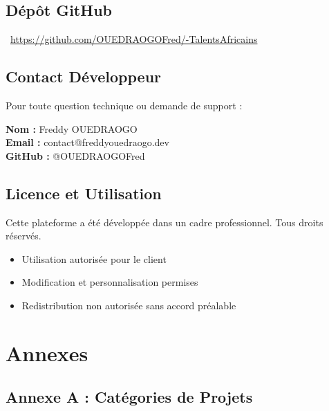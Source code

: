 \documentclass[12pt,a4paper]{article}
\begin{document}
\subsection{Dépôt GitHub}

\begin{tcolorbox}[colback=primarycolor!10, colframe=primarycolor]
\centering
\faGithub\ \url{https://github.com/OUEDRAOGOFred/-TalentsAfricains}
\end{tcolorbox}

\subsection{Contact Développeur}

Pour toute question technique ou demande de support :

\begin{tcolorbox}[colback=secondarycolor!10, colframe=secondarycolor, title=\faUser\ Développeur]
\textbf{Nom :} Freddy OUEDRAOGO\\
\textbf{Email :} contact@freddyouedraogo.dev\\
\textbf{GitHub :} @OUEDRAOGOFred
\end{tcolorbox}

\subsection{Licence et Utilisation}

Cette plateforme a été développée dans un cadre professionnel. Tous droits réservés.

\begin{itemize}[leftmargin=*]
    \item Utilisation autorisée pour le client
    \item Modification et personnalisation permises
    \item Redistribution non autorisée sans accord préalable
\end{itemize}

\newpage
\section*{Annexes}

\subsection*{Annexe A : Catégories de Projets}
\end{document}
